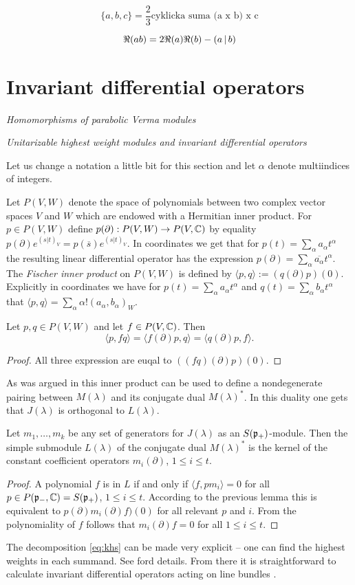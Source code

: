 \[
\{a,b,c\} = \frac{2}{3}\text{cyklicka suma (a x b) x c}
\]

\[
\Re (ab) = 2\Re(a)\Re(b) - \left( a \,|\, b \right)
\]

\section{Invariant differential operators}
\emph{Homomorphisms of parabolic Verma modules}

\emph{Unitarizable highest weight modules and invariant differential operators}

Let us change a notation a little bit for this section and let $\alpha$ denote multiindices of integers.

Let $P(V,W)$ denote the space of polynomials between two complex vector spaces $V$ and $W$ which are endowed with a Hermitian inner product. For $p\in P(V,W)$ define $p(\partial):P(V,W)\to P(V,\mathbb{C})$ by equality $p(\partial) e^{(s|t)_V} = p(\overline{s})e^{(s|t)_V}$. In coordinates we get that for $p(t) = \sum_{\alpha} a_{\alpha} t^{\alpha}$ the resulting linear differential operator has the expression $p(\partial)= \sum_{\alpha} \overline{a_{\alpha}} t^{\alpha}$. The \emph{Fischer inner product} on $P(V,W)$ is defined by $\langle p,q\rangle := (q(\partial)p)(0)$. Explicitly in coordinates we have for  $p(t) = \sum_{\alpha} a_{\alpha} t^{\alpha}$ and  $q(t) = \sum_{\alpha} b_{\alpha} t^{\alpha}$ that $\langle p,q\rangle = \sum_{\alpha} \alpha! (a_{\alpha},b_{\alpha})_W$.

\begin{lemma}
 Let $p,q\in P(V,W)$ and let $f\in P(V,\mathbb{C})$. Then
 \[
  \langle p,fq\rangle = \langle f(\partial)p, q \rangle = \langle q(\partial)p,f \rangle.
 \]
\end{lemma}
\begin{proof}
 All three expression are euqal to $((fq)(\partial)p)(0)$.
\end{proof}

As was argued in \cite{davidson_differential_1991} this inner product can be used to define a nondegenerate pairing between $M(\lambda)$ and its conjugate dual $M(\lambda)^*$. In this duality one gets that $J(\lambda)$ is orthogonal to $L(\lambda)$.

\begin{theorem}
 Let $m_1,\ldots,m_k$ be any set of generators for $J(\lambda)$ as an $S(\mathfrak{p}_+)$-module. Then the simple submodule $L(\lambda)$ of the conjugate dual $M(\lambda)^*$ is the kernel of the constant coefficient operators $m_i(\partial)$, $1\leq i\leq t.$
\end{theorem}
\begin{proof}
 A polynomial $f$ is in $L$ if and only if $\langle f, p m_i \rangle = 0$ for all $p\in P(\mathfrak{p}_-,\mathbb{C}) = S(\mathfrak{p}_+)$, $1\leq i\leq t$. According to the previous lemma this is equivalent to $p(\partial)  m_i(\partial)f)(0)$ for all relevant $p$ and $i$. From the polynomiality of $f$ follows that $m_i(\partial)f = 0$ for all $1\leq i\leq t.$
\end{proof}

The decomposition \eqref{eq:khs} can be made very explicit -- one can find the highest weights in each summand. See \cite{goodman_symmetry_2009} ford details. From there it is straightforward to calculate invariant differential operators acting on line bundles \cite{tucek_invariant_2017}. 